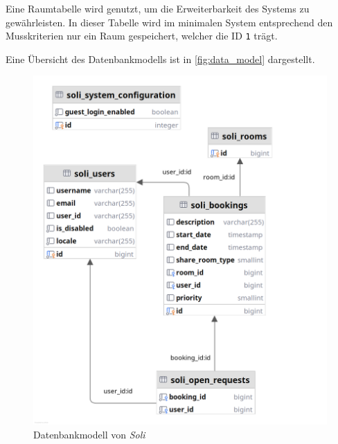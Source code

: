 Eine Raumtabelle wird genutzt, um die Erweiterbarkeit des Systems zu gewährleisten.
In dieser Tabelle wird im minimalen System entsprechend den Musskriterien nur ein Raum gespeichert, welcher die ID \texttt{1} trägt.

Eine Übersicht des Datenbankmodells ist in \autoref{fig:data_model} dargestellt.

\begin{figure}[ht]
    \centering
    \includegraphics[width=\textwidth]{figures/database}
    \caption{Datenbankmodell von \textit{Soli}}
    \label{fig:data_model}
\end{figure}
\pagebreak


